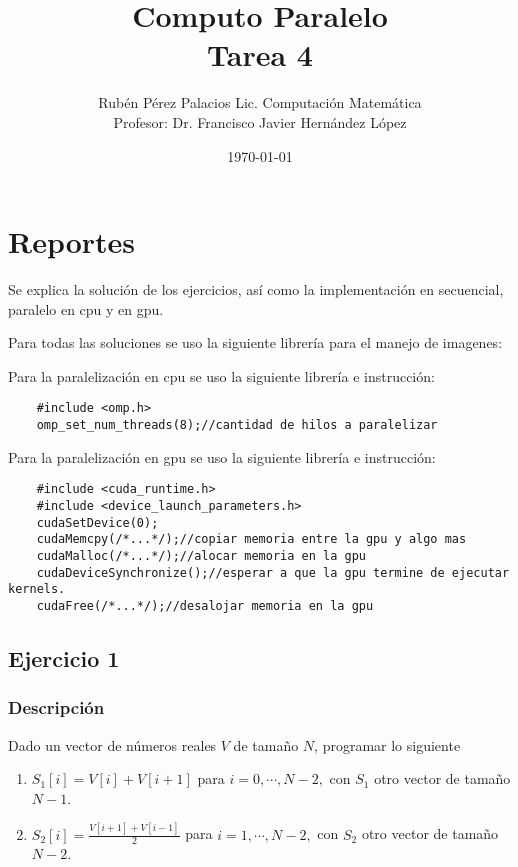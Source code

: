 \documentclass[letterpaper]{article}
\title{Computo Paralelo \\ Tarea 4}
\author{Rubén Pérez Palacios Lic. Computación Matemática\\Profesor: Dr. Francisco Javier Hernández López}
\date{\today}
\theoremstyle{definition}
\theoremstyle{lemathm}
\theoremstyle{lemathm}
\theoremstyle{lemathm}
\theoremstyle{lemademthm}
\newcommand{\1}{\mathbbm{1}}
\begin{document}
	\maketitle

	\section*{Reportes}

	Se explica la solución de los ejercicios, así como la implementación en secuencial, paralelo en cpu y en gpu.

	Para todas las soluciones se uso la siguiente librería para el manejo de imagenes:

	Para la paralelización en cpu se uso la siguiente librería e instrucción:

	\begin{verbatim}
	#include <omp.h>
	omp_set_num_threads(8);//cantidad de hilos a paralelizar
	\end{verbatim}

	Para la paralelización en gpu se uso la siguiente librería e instrucción:

	\begin{verbatim}
	#include <cuda_runtime.h>
	#include <device_launch_parameters.h>
	cudaSetDevice(0);
	cudaMemcpy(/*...*/);//copiar memoria entre la gpu y algo mas
	cudaMalloc(/*...*/);//alocar memoria en la gpu 
	cudaDeviceSynchronize();//esperar a que la gpu termine de ejecutar kernels.
	cudaFree(/*...*/);//desalojar memoria en la gpu
	\end{verbatim}

	\newpage

	\subsection*{Ejercicio 1}

	\subsubsection*{Descripción}

	Dado un vector de números reales $V$ de tamaño $N$, programar lo siguiente

	\begin{enumerate}
		\item $S_1[i] = V[i] + V[i+1]$ para $i = 0,\cdots,N-2,$ con $S_1$ otro vector de tamaño $N-1$.
		\item $S_2[i] = \frac{V[i+1] + V[i-1]}{2}$ para $i = 1,\cdots,N-2,$ con $S_2$ otro vector de tamaño $N-2$.
	\end{enumerate}
\end{document}
